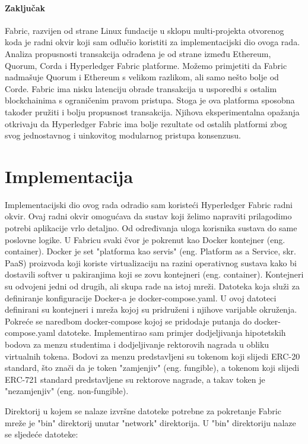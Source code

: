 \documentclass[times, utf8, diplomski]{fer}
\begin{document}
\subsubsection{Zaključak}

Fabric, razvijen od strane Linux fundacije u sklopu multi-projekta otvorenog koda je radni okvir koji sam odlučio koristiti za implementacijski dio ovoga rada. Analiza propusnosti transakcija odrađena je od strane \citep{9411380} između Ethereum, Quorum, Corda i Hyperledger Fabric platforme. Možemo primjetiti da Fabric nadmašuje Quorum i Ethereum s velikom razlikom, ali samo nešto bolje od Corde. Fabric ima nisku latenciju obrade transakcija u usporedbi s ostalim blockchainima s ograničenim pravom pristupa. Stoga je ova platforma sposobna također pružiti i bolju propusnost transakcija. Njihova eksperimentalna opažanja otkrivaju da Hyperledger Fabric ima bolje rezultate od ostalih platformi zbog svog jednostavnog i uinkovitog modularnog pristupa konsenzusu.

\chapter{Implementacija}
Implementacijski dio ovog rada odradio sam koristeći Hyperledger Fabric radni okvir.  Ovaj radni okvir omogućava da sustav koji želimo napraviti prilagodimo potrebi aplikacije vrlo detaljno. Od određivanja uloga korisnika sustava do same poslovne logike. U Fabricu svaki čvor je pokrenut kao Docker kontejner (eng. container). Docker je set "platforma kao servis" (eng. Platform as a Service, skr. PaaS) proizvoda koji koriste virtualizaciju na razini operativnog sustava kako bi dostavili softver u pakiranjima koji se zovu kontejneri (eng. container). Kontejneri su odvojeni jedni od drugih, ali skupa rade na istoj mreži. Datoteka koja služi za definiranje konfiguracije Docker-a je docker-compose.yaml. U ovoj datoteci definirani su kontejneri i mreža kojoj su pridruženi i njihove varijable okruženja. Pokreće se naredbom docker-compose kojoj se pridodaje putanja do docker-compose.yaml datoteke.
Implementirao sam primjer dodjeljivanja hipotetskih bodova za menzu studentima i dodjeljivanje rektorovih nagrada u obliku virtualnih tokena. Bodovi za menzu predstavljeni su tokenom koji slijedi ERC-20 standard, što znači da je token "zamjenjiv" (eng. fungible), a tokenom koji slijedi ERC-721 standard predstavljene su rektorove nagrade, a takav token je "nezamjenjiv" (eng. non-fungible).

Direktorij u kojem se nalaze izvršne datoteke potrebne za pokretanje Fabric mreže je "bin" direktorij unutar "network" direktorija. U "bin" direktoriju nalaze se sljedeće datoteke:
\end{document}
